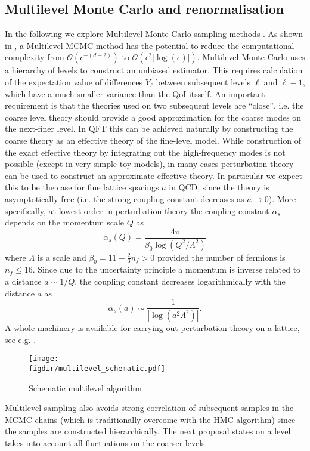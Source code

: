 \documentclass[11pt]{article}
\newcommand{\figdir}{./figures/}
\begin{document}
\subsection{Multilevel Monte Carlo and renormalisation}
In the following we explore Multilevel Monte Carlo sampling methods \cite{Heinrich2001,Giles2008,Giles2015}. As shown in \cite{Dodwell2015}, a Multilevel MCMC method has the potential to reduce the computational complexity from $\mathcal{O}(\epsilon^{-(d+2)})$ to $\mathcal{O}(\epsilon^2 |\log(\epsilon)|)$. Multilevel Monte Carlo uses a hierarchy of levels to construct an unbiased estimator. This requires calculation of the expectation value of differences $Y_\ell$ between subsequent levels $\ell$ and $\ell-1$, which have a much smaller variance than the QoI itsself. An important requirement is that the theories used on two subsequent levels are ``close'', i.e. the coarse level theory should provide a good approximation for the coarse modes on the next-finer level. In QFT this can be achieved naturally by constructing the coarse theory as an effective theory of the fine-level model. While construction of the exact effective theory by integrating out the high-frequency modes is not possible (except in very simple toy models), in many cases perturbation theory can be used to construct an approximate effective theory. In particular we expect this to be the case for fine lattice spacings $a$ in QCD, since the theory is asymptotically free (i.e. the strong coupling constant decreases as $a\rightarrow 0$). More specifically, at lowest order in perturbation theory the coupling constant $\alpha_s$ depends on the momentum scale $Q$ as
\begin{equation}
  \alpha_s(Q) = \frac{4\pi}{\beta_0 \log(Q^2/\Lambda^2)}
\end{equation}
where $\Lambda$ is a scale and $\beta_0=11-\frac{2}{3}n_f>0$ provided the number of fermions is $n_f\le 16$. Since due to the uncertainty principle a momentum is inverse related to a distance $a\sim 1/Q$, the coupling constant decreases logarithmically with the distance $a$ as
\begin{equation}
  \alpha_s(a) \sim \frac{1}{|\log(a^2\Lambda^2)|}.
\end{equation}
A whole machinery is available for carrying out perturbation theory on a lattice, see e.g. \cite{Rothe2005,Hart2009}.
\begin{figure}
\begin{center}
\texttt{[image: \\figdir/multilevel\_schematic.pdf]}
\caption{Schematic multilevel algorithm}
\label{fig:multilevel_schematic}
\end{center}
\end{figure}
Multilevel sampling also avoids strong correlation of subsequent samples in the MCMC chains (which is traditionally overcome with the HMC algorithm) since the samples are constructed hierarchically. The next proposal states on a level takes into account all fluctuations on the coarser levels.
\end{document}
